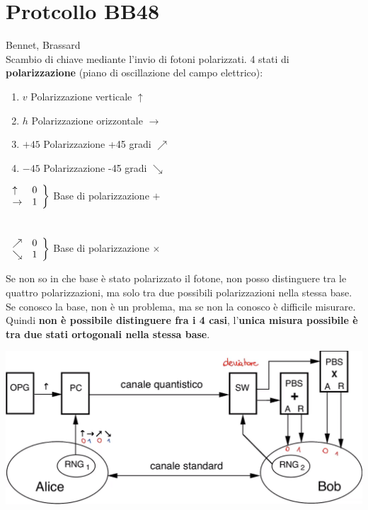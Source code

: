 \documentclass[10pt]{book}
\begin{document}
\section{Protcollo BB48} Bennet, Brassard\\
Scambio di chiave mediante l'invio di fotoni polarizzati. 4 stati di \textbf{polarizzazione} (piano di oscillazione del campo elettrico):
\begin{multicols}{2}
\begin{enumerate}
	\item $v$ Polarizzazione verticale $\uparrow$
	\item $h$ Polarizzazione orizzontale $\rightarrow$
	\item $+45$ Polarizzazione +45 gradi $\nearrow$
	\item $-45$ Polarizzazione -45 gradi $\searrow$
\end{enumerate}
\columnbreak
$\left. \begin{array}{l l}
	\uparrow&0\\
	\rightarrow&1
\end{array}\right\}$ Base di polarizzazione $+$\\\\\\
$\left. \begin{array}{l l}
	\nearrow&0\\
	\searrow&1
\end{array}\right\}$ Base di polarizzazione $\times$
\end{multicols}
Se non so in che base è stato polarizzato il fotone, non posso distinguere tra le quattro polarizzazioni, ma solo tra due possibili polarizzazioni nella stessa base. Se conosco la base, non è un problema, ma se non la conosco è difficile misurare.\\
Quindi \textbf{non è possibile distinguere fra i 4 casi}, l'\textbf{unica misura possibile è tra due stati ortogonali nella stessa base}.
\pagebreak
\begin{center}
	\includegraphics[scale=0.5]{21.png}
\end{center}
\end{document}
